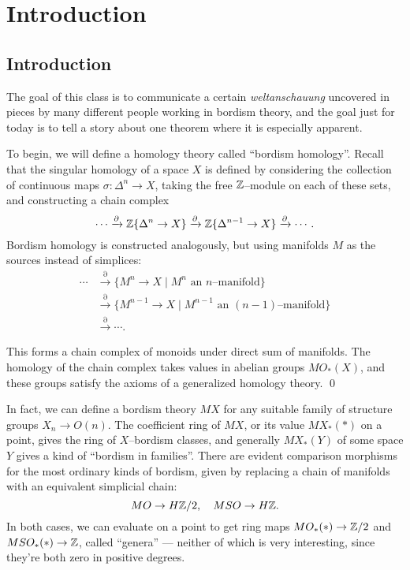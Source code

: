 
\setcounter{chapter}{-1}
\chapter{Introduction}

\section{Introduction}\label{IntroductionSection}

The goal of this class is to communicate a certain \textit{weltanschauung} uncovered in pieces by many different people working in bordism theory, and the goal just for today is to tell a story about one theorem where it is especially apparent.

To begin, we will define a homology theory called ``bordism homology''.  Recall that the singular homology of a space $X$ is defined by considering the collection of continuous maps $\sigma: \Delta^n \to X$, taking the free $\mathbb Z$--module on each of these sets, and constructing a chain complex \[\cdots \xrightarrow{\partial} \mathbb Z\{\Delta^n \to X\} \xrightarrow{\partial} \mathbb Z\{\Delta^{n-1} \to X\} \xrightarrow{\partial} \cdots.\]  Bordism homology is constructed analogously, but using manifolds $M$ as the sources instead of simplices:
\begin{align*}
\cdots & \xrightarrow{\partial} \{M^n \to X \mid \text{$M^n$ an $n$--manifold}\} \\
& \xrightarrow{\partial} \{M^{n-1} \to X \mid \text{$M^{n-1}$ an $(n-1)$--manifold}\} \\
& \xrightarrow{\partial} \cdots.
\end{align*}

\begin{lemma}
This forms a chain complex of monoids under direct sum of manifolds.  The homology of the chain complex takes values in abelian groups $MO_*(X)$, and these groups satisfy the axioms of a generalized homology theory. \qed
\end{lemma}

In fact, we can define a bordism theory $MX$ for any suitable family of structure groups $X_n \to O(n)$.  The coefficient ring of $MX$, or its value $MX_*(*)$ on a point, gives the ring of $X$--bordism classes, and generally $MX_*(Y)$ of some space $Y$ gives a kind of ``bordism in families''.  There are evident comparison morphisms for the most ordinary kinds of bordism, given by replacing a chain of manifolds with an equivalent simplicial chain: \[MO \to H\mathbb Z/2, \quad MSO \to H\mathbb Z.\] In both cases, we can evaluate on a point to get ring maps $MO_*(*) \to \mathbb Z/2$ and $MSO_*(*) \to \mathbb Z$, called ``genera'' --- neither of which is very interesting, since they're both zero in positive degrees.


